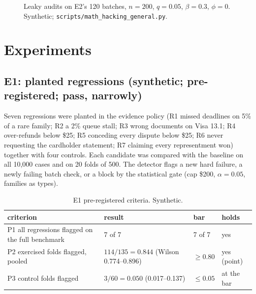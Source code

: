 \documentclass[11pt]{article}
\theoremstyle{definition}
\theoremstyle{remark}
\newcommand{\E}{\mathbb{E}}
\newcommand{\1}{\mathbf{1}}
\begin{document}
\begin{figure}[t]
\centering
{}
\caption{Leaky audits on E2's 120 batches, $n=200$, $q=0.05$, $\beta=0.3$, $\phi=0$. Synthetic; \texttt{scripts/math\_hacking\_general.py}.}\label{fig:leak}
\end{figure}

\section{Experiments}\label{sec:experiments}

\subsection{E1: planted regressions (synthetic; pre-registered; pass, narrowly)}\label{sec:e1}

Seven regressions were planted in the evidence policy (R1 missed deadlines on 5\% of a rare family; R2 a 2\% queue stall; R3 wrong documents on Visa 13.1; R4 over-refunds below \$25; R5 conceding every dispute below \$25; R6 never requesting the cardholder statement; R7 claiming every representment won) together with four controls. Each candidate was compared with the baseline on all 10{,}000 cases and on 20 folds of 500. The detector flags a new hard failure, a newly failing batch check, or a block by the statistical gate (cap \$200, $\alpha=0.05$, families as types).

\begin{table}[h]
\centering\small
\caption{E1 pre-registered criteria. Synthetic.}\label{tab:e1}
\footnotesize
\begin{tabular}{@{}llll@{}}
\toprule
criterion & result & bar & holds\\
\midrule
P1 all regressions flagged on the full benchmark & 7 of 7 & 7 of 7 & yes\\
P2 exercised folds flagged, pooled & $114/135=0.844$ (Wilson 0.774--0.896) & $\ge0.80$ & yes (point)\\
P3 control folds flagged & $3/60=0.050$ (0.017--0.137) & $\le0.05$ & at the bar\\
\bottomrule
\end{tabular}
\end{table}
\end{document}
